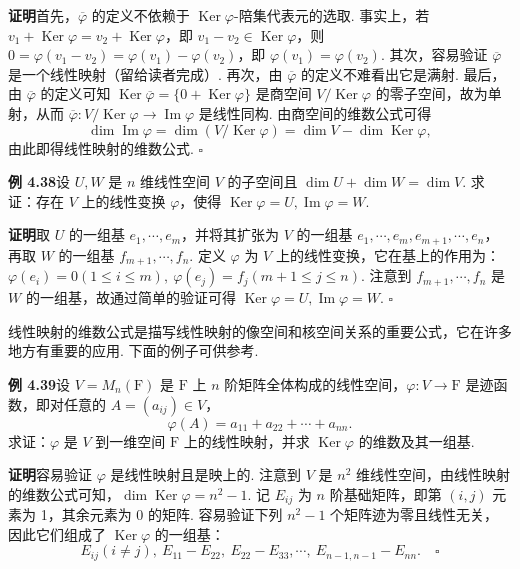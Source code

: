 \documentclass[UTF8,12pt,a4paper,fontset=fandol]{ctexart}
\begin{document}
\noindent\textbf{证明}\quad 首先，$\overline{\varphi}$ 的定义不依赖于 $\operatorname{Ker}\varphi$-陪集代表元的选取. 事实上，若 $v_1+\operatorname{Ker}\varphi=v_2+\operatorname{Ker}\varphi$，即 $v_1-v_2\in\operatorname{Ker}\varphi$，则 $0=\varphi(v_1-v_2)=\varphi(v_1)-\varphi(v_2)$，即 $\varphi(v_1)=\varphi(v_2)$. 其次，容易验证 $\overline{\varphi}$ 是一个线性映射（留给读者完成）. 再次，由 $\overline{\varphi}$ 的定义不难看出它是满射. 最后，由 $\overline{\varphi}$ 的定义可知 $\operatorname{Ker}\overline{\varphi}=\{0+\operatorname{Ker}\varphi\}$ 是商空间 $V/\operatorname{Ker}\varphi$ 的零子空间，故为单射，从而 $\overline{\varphi}:V/\operatorname{Ker}\varphi\to\operatorname{Im}\varphi$ 是线性同构. 由商空间的维数公式可得
\[
\dim\operatorname{Im}\varphi=\dim(V/\operatorname{Ker}\varphi)=\dim V-\dim\operatorname{Ker}\varphi,
\]
由此即得线性映射的维数公式. $\square$

\noindent\textbf{例 4.38}\quad 设 $U,W$ 是 $n$ 维线性空间 $V$ 的子空间且 $\dim U+\dim W=\dim V$. 求证：存在 $V$ 上的线性变换 $\varphi$，使得 $\operatorname{Ker}\varphi=U,\operatorname{Im}\varphi=W$.

\noindent\textbf{证明}\quad 取 $U$ 的一组基 $e_1,\cdots,e_m$，并将其扩张为 $V$ 的一组基 $e_1,\cdots,e_m,e_{m+1},\cdots,e_n$，再取 $W$ 的一组基 $f_{m+1},\cdots,f_n$. 定义 $\varphi$ 为 $V$ 上的线性变换，它在基上的作用为：$\varphi(e_i)=0(1\le i\le m),\ \varphi(e_j)=f_j(m+1\le j\le n)$. 注意到 $f_{m+1},\cdots,f_n$ 是 $W$ 的一组基，故通过简单的验证可得 $\operatorname{Ker}\varphi=U,\operatorname{Im}\varphi=W$. $\square$

线性映射的维数公式是描写线性映射的像空间和核空间关系的重要公式，它在许多地方有重要的应用. 下面的例子可供参考.

\noindent\textbf{例 4.39}\quad 设 $V=M_n(\mathrm{F})$ 是 $\mathrm{F}$ 上 $n$ 阶矩阵全体构成的线性空间，$\varphi:V\to\mathrm{F}$ 是迹函数，即对任意的 $A=(a_{ij})\in V$，
\[
\varphi(A)=a_{11}+a_{22}+\cdots+a_{nn}.
\]
求证：$\varphi$ 是 $V$ 到一维空间 $\mathrm{F}$ 上的线性映射，并求 $\operatorname{Ker}\varphi$ 的维数及其一组基.

\noindent\textbf{证明}\quad 容易验证 $\varphi$ 是线性映射且是映上的. 注意到 $V$ 是 $n^2$ 维线性空间，由线性映射的维数公式可知，$\dim\operatorname{Ker}\varphi=n^2-1$. 记 $E_{ij}$ 为 $n$ 阶基础矩阵，即第 $(i,j)$ 元素为 1，其余元素为 0 的矩阵. 容易验证下列 $n^2-1$ 个矩阵迹为零且线性无关，因此它们组成了 $\operatorname{Ker}\varphi$ 的一组基：
\[
E_{ij}(i\ne j),\ E_{11}-E_{22},\ E_{22}-E_{33},\cdots,\ E_{n-1,n-1}-E_{nn}. \quad \square
\]
\end{document}
